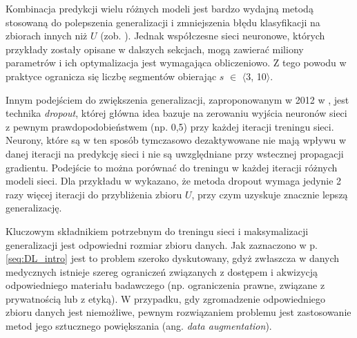 Kombinacja predykcji wielu różnych modeli jest bardzo wydajną metodą stosowaną do polepszenia generalizacji i zmniejszenia błędu klasyfikacji na zbiorach innych niż $U$ (zob. \cite{Bell2007, Breiman2001}). Jednak współczesne sieci neuronowe, których przykłady zostały opisane w dalszych sekcjach, mogą zawierać miliony parametrów i ich optymalizacja jest wymagająca obliczeniowo. Z tego powodu w praktyce ogranicza się liczbę segmentów obierając $s$ $\in$ $\langle$3, 10$\rangle$.

Innym podejściem do zwiększenia generalizacji, zaproponowanym w 2012 w \cite{DBLP:journals/corr/abs-1207-0580}, jest technika \textit{dropout}, której główna idea bazuje na zerowaniu wyjścia neuronów sieci z pewnym prawdopodobieństwem (np. 0,5) przy każdej iteracji treningu sieci. Neurony, które są w ten sposób tymczasowo dezaktywowane nie mają wpływu w danej iteracji na predykcję sieci i nie są uwzględniane przy wstecznej propagacji gradientu. Podejście to można porównać do treningu w każdej iteracji różnych modeli sieci. Dla przykładu w \cite{Krizhevsky2012} wykazano, że metoda dropout wymaga jedynie 2 razy więcej iteracji do przybliżenia zbioru $U$, przy czym uzyskuje znacznie lepszą generalizację. 

Kluczowym składnikiem potrzebnym do treningu sieci i maksymalizacji generalizacji jest odpowiedni rozmiar zbioru danych. Jak zaznaczono w p. \ref{seq:DL_intro} jest to problem szeroko dyskutowany, gdyż zwłaszcza w danych medycznych istnieje szereg ograniczeń związanych z dostępem i akwizycją odpowiedniego materiału badawczego (np. ograniczenia prawne, związane z prywatnością lub z etyką). W przypadku, gdy zgromadzenie odpowiedniego zbioru danych jest niemożliwe, pewnym rozwiązaniem problemu jest zastosowanie metod jego sztucznego powiększania (ang. \textit{data augmentation}).

